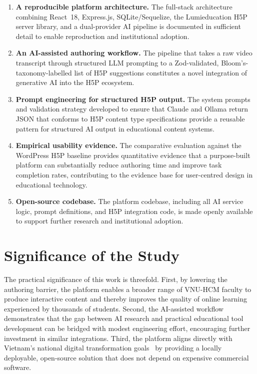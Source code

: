 \begin{enumerate}
  \item \textbf{A reproducible platform architecture.} The full-stack
  architecture combining React~18, Express.js, SQLite/Sequelize, the
  Lumieducation H5P server library, and a dual-provider AI pipeline is
  documented in sufficient detail to enable reproduction and institutional
  adoption.

  \item \textbf{An AI-assisted authoring workflow.} The pipeline that takes
  a raw video transcript through structured LLM prompting to a
  Zod-validated, Bloom's-taxonomy-labelled list of H5P suggestions
  constitutes a novel integration of generative AI into the H5P ecosystem.

  \item \textbf{Prompt engineering for structured H5P output.} The system
  prompts and validation strategy developed to ensure that Claude and Ollama
  return JSON that conforms to H5P content type specifications provide a
  reusable pattern for structured AI output in educational content systems.

  \item \textbf{Empirical usability evidence.} The comparative evaluation
  against the WordPress H5P baseline provides quantitative evidence that a
  purpose-built platform can substantially reduce authoring time and improve
  task completion rates, contributing to the evidence base for user-centred
  design in educational technology.

  \item \textbf{Open-source codebase.} The platform codebase, including all
  AI service logic, prompt definitions, and H5P integration code, is made
  openly available to support further research and institutional adoption.
\end{enumerate}

\section{Significance of the Study}

The practical significance of this work is threefold. First, by lowering
the authoring barrier, the platform enables a broader range of VNU-HCM
faculty to produce interactive content and thereby improves the quality
of online learning experienced by thousands of students. Second, the
AI-assisted workflow demonstrates that the gap between AI research and
practical educational tool development can be bridged with modest engineering
effort, encouraging further investment in similar integrations. Third, the
platform aligns directly with Vietnam's national digital transformation
goals~\cite{vietnam_strategy2021} by providing a locally deployable,
open-source solution that does not depend on expensive commercial software.

